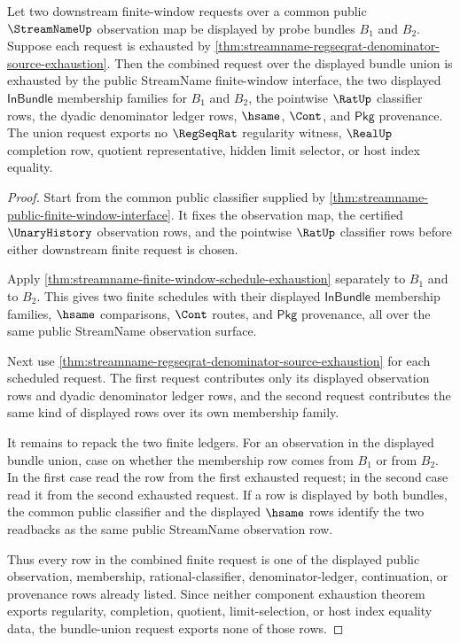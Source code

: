 \begin{theorem}
\label{thm:streamname-regseqrat-window-union-exhaustion}
Let two downstream finite-window requests over a common public
$\StreamNameUp$ observation map be displayed by probe bundles $B_1$ and
$B_2$. Suppose each request is exhausted by
\autoref{thm:streamname-regseqrat-denominator-source-exhaustion}. Then the
combined request over the displayed bundle union is exhausted by the public
StreamName finite-window interface, the two displayed
$\mathsf{InBundle}$ membership families for $B_1$ and $B_2$, the pointwise
$\RatUp$ classifier rows, the dyadic denominator ledger rows, $\hsame$,
$\Cont$, and $\mathsf{Pkg}$ provenance. The union request exports no
$\RegSeqRat$ regularity witness, $\RealUp$ completion row, quotient
representative, hidden limit selector, or host index equality.
\end{theorem}
\begin{proof}
Start from the common public classifier supplied by
\autoref{thm:streamname-public-finite-window-interface}. It fixes the
observation map, the certified $\UnaryHistory$ observation rows, and the
pointwise $\RatUp$ classifier rows before either downstream finite request is
chosen.

Apply \autoref{thm:streamname-finite-window-schedule-exhaustion} separately
to $B_1$ and to $B_2$. This gives two finite schedules with their displayed
$\mathsf{InBundle}$ membership families, $\hsame$ comparisons, $\Cont$
routes, and $\mathsf{Pkg}$ provenance, all over the same public StreamName
observation surface.

Next use \autoref{thm:streamname-regseqrat-denominator-source-exhaustion} for
each scheduled request. The first request contributes only its displayed
observation rows and dyadic denominator ledger rows, and the second request
contributes the same kind of displayed rows over its own membership family.

It remains to repack the two finite ledgers. For an observation in the
displayed bundle union, case on whether the membership row comes from $B_1$
or from $B_2$. In the first case read the row from the first exhausted
request; in the second case read it from the second exhausted request. If a
row is displayed by both bundles, the common public classifier and the
displayed $\hsame$ rows identify the two readbacks as the same public
StreamName observation row.

Thus every row in the combined finite request is one of the displayed public
observation, membership, rational-classifier, denominator-ledger,
continuation, or provenance rows already listed. Since neither component
exhaustion theorem exports regularity, completion, quotient, limit-selection,
or host index equality data, the bundle-union request exports none of those
rows.
\end{proof}

